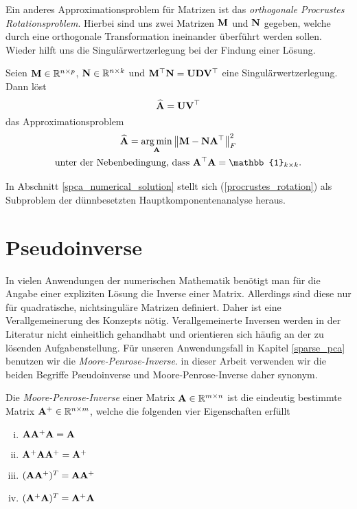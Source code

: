 Ein anderes Approximationsproblem für Matrizen ist das \textit{orthogonale Procrustes Rotationsproblem}. Hierbei sind uns zwei Matrizen $\mathbf{M}$ und $\mathbf{N}$ gegeben, welche durch eine orthogonale Transformation ineinander überführt werden sollen. Wieder hilft uns die Singulärwertzerlegung bei der Findung einer Lösung.

\begin{thm}
Seien $\mathbf{M} \in \mathbb{R}^{n \times p}$, $\mathbf{N} \in \mathbb{R}^{n \times k}$ und $\mathbf{M}^{\top} \mathbf{N} = \mathbf{U}\mathbf{D} \mathbf{V}^{\top}$ eine Singulärwertzerlegung. Dann löst
$$\widehat{\mathbf{A}} = \mathbf{U} \mathbf{V}^{\top}$$
das Approximationsproblem
\begin{align}
\label{procrustes_rotation}
\begin{gathered}
\widehat{\mat A} = \argmin_{\mat A} \norm{\mat M - \mat N \mat A^{\top}}_F^2\\
\text{unter der Nebenbedingung, dass } \mat A^{\top} \mat A = \mat{\mathbb{1}}_{k \times k}.
\end{gathered}
\end{align}
\end{thm}
In Abschnitt \ref{spca_numerical_solution} stellt sich (\ref{procrustes_rotation}) als Subproblem der dünnbesetzten Hauptkomponentenanalyse heraus.

\section{Pseudoinverse}

In vielen Anwendungen der numerischen Mathematik benötigt man für die Angabe einer expliziten Lösung die Inverse einer Matrix. Allerdings sind diese nur für quadratische, nichtsinguläre Matrizen definiert. Daher ist eine Verallgemeinerung des Konzepts nötig. Verallgemeinerte Inversen werden in der Literatur nicht einheitlich gehandhabt und orientieren sich häufig an der zu lösenden Aufgabenstellung. Für unseren Anwendungsfall in Kapitel \ref{sparse_pca} benutzen wir die \textit{Moore-Penrose-Inverse}. in dieser Arbeit verwenden wir die beiden Begriffe Pseudoinverse und Moore-Penrose-Inverse daher synonym.
\begin{defn}
Die \textit{Moore-Penrose-Inverse} einer Matrix $\mathbf{A} \in \mathbb{R}^{m \times n}$ ist die eindeutig bestimmte Matrix $\mathbf{A}^+ \in \mathbb{R}^{n \times m}$, welche die folgenden vier Eigenschaften erfüllt
\begin{enumerate}[(i)]
\item $\mathbf{A} \mathbf{A}^+ \mathbf{A} = \mathbf{A}$
\item $\mathbf{A}^+ \mathbf{A} \mathbf{A}^+ = \mathbf{A}^+$
\item $(\mathbf{A} \mathbf{A}^+)^T = \mathbf{A} \mathbf{A}^+$
\item $(\mathbf{A}^+ \mathbf{A})^T = \mathbf{A}^+ \mathbf{A}$
\end{enumerate}
\end{defn}

